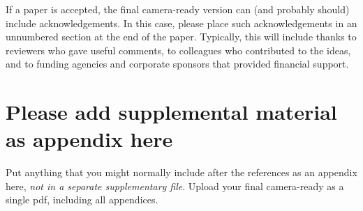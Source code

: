 \documentclass{article}
\begin{document}
If a paper is accepted, the final camera-ready version can (and
probably should) include acknowledgements. In this case, please
place such acknowledgements in an unnumbered section at the
end of the paper. Typically, this will include thanks to reviewers
who gave useful comments, to colleagues who contributed to the ideas,
and to funding agencies and corporate sponsors that provided financial
support.


\nocite{langley00}
\fi





\appendix
\section{Please add supplemental material as appendix here}
%
Put anything that you might normally include after the references as an appendix here, {\it not in a separate supplementary file}. Upload your final camera-ready as a single pdf, including all appendices.

\end{document}
